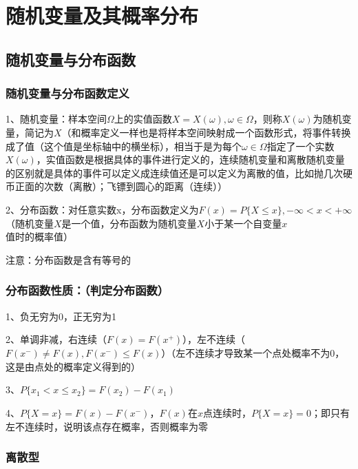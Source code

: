 \chapter{随机变量及其概率分布}

\section{随机变量与分布函数}



\subsection{随机变量与分布函数定义}

1、随机变量：样本空间$\Omega$上的实值函数$X=X(\omega), \omega \in \Omega$，则称$X(\omega)$为随机变量，简记为$X$（和概率定义一样也是将样本空间映射成一个函数形式，将事件转换成了值（这个值是坐标轴中的横坐标），相当于是为每个$\omega \in \Omega$指定了一个实数$X(\omega)$，实值函数是根据具体的事件进行定义的，连续随机变量和离散随机变量的区别就是具体的事件可以定义成连续值还是可以定义为离散的值，比如抛几次硬币正面的次数（离散）；飞镖到圆心的距离（连续））

2、分布函数：对任意实数x，分布函数定义为$F(x) = P\{ X \le x\}, -\infty < x < +\infty$（随机变量$X$是一个值，分布函数为随机变量$X$小于某一个自变量$x$值时的概率值）

注意：分布函数是含有等号的



\subsection{分布函数性质：（判定分布函数）}

1、负无穷为0，正无穷为1

2、单调非减，右连续（$F(x)=F(x^+)$），左不连续（$ F(x^-) \ne F(x) , F(x^-) \le F(x) $）（左不连续才导致某一个点处概率不为0，这是由点处的概率定义得到的）

3、$P\{ x_1 < x \le x_2\} = F(x_2)-F(x_1)$

4、$P\{X=x\} = F(x)-F(x^-)$，$F(x)$在$x$点连续时，$P\{X=x\} = 0$；即只有左不连续时，说明该点存在概率，否则概率为零



\subsection{离散型}

